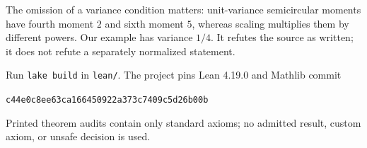 \documentclass[11pt]{article}
\begin{document}
The omission of a variance condition matters: unit-variance semicircular moments have fourth moment $2$ and sixth moment $5$, whereas scaling multiplies them by different powers. Our example has variance $1/4$. It refutes the source as written; it does not refute a separately normalized statement.

Run \texttt{lake build} in \texttt{lean/}. The project pins Lean 4.19.0 and Mathlib commit
\begin{center}\texttt{c44e0c8ee63ca166450922a373c7409c5d26b00b}\end{center}
Printed theorem audits contain only standard axioms; no admitted result, custom axiom, or unsafe decision is used.
\end{document}
